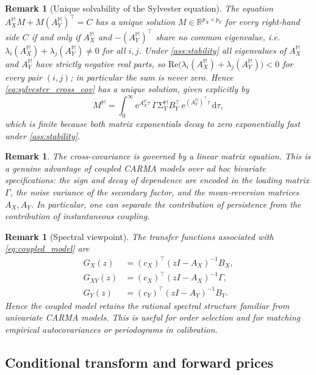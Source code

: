 \documentclass[10pt,a4paper,reqno]{amsart}
\newtheorem{remark}[theorem]{Remark}
\newcommand{\1}{\mathbbm{1}}
\newcommand{\dd}{\mathrm{d}}
\newcommand{\ee}{\mathrm{e}}
\begin{document}
\begin{remark}[Unique solvability of the Sylvester equation]
\label{rem:sylvester_unique}
The equation $A_X^{\mathbb{M}} M + M(A_Y^{\mathbb{M}})^\top = C$ has a unique
solution $M \in \mathbb{R}^{p_X \times p_Y}$ for every right-hand side $C$ if
and only if $A_X^{\mathbb{M}}$ and $-(A_Y^{\mathbb{M}})^\top$ share no common
eigenvalue, i.e.\ $\lambda_i(A_X^{\mathbb{M}}) + \lambda_j(A_Y^{\mathbb{M}}) \ne
0$ for all $i,j$.
Under \ref{ass:stability} all eigenvalues of
$A_X^{\mathbb{M}}$ and $A_Y^{\mathbb{M}}$ have strictly negative real parts, so
$\mathrm{Re}\bigl(\lambda_i(A_X^{\mathbb{M}}) + \lambda_j(A_Y^{\mathbb{M}})\bigr)
< 0$ for every pair $(i,j)$; in particular the sum is never zero.
Hence \eqref{eq:sylvester_cross_cov} has a unique solution, given explicitly by
$$
  M^{\mathbb{M}}
  = \int_0^\infty
      \ee^{A_X^{\mathbb{M}}\tau}\,
      \Gamma\Sigma_Y^{\mathbb{M}} B_Y^\top\,
      \ee^{(A_Y^{\mathbb{M}})^\top\tau}
    \,\dd\tau,
$$
which is finite because both matrix exponentials decay to zero exponentially fast
under \ref{ass:stability}.
\end{remark}

\begin{remark}
The cross-covariance is governed by a linear matrix equation. This is a genuine
advantage of coupled CARMA models over ad hoc bivariate specifications: the sign
and decay of dependence are encoded in the loading matrix $\Gamma$, the noise
variance of the secondary factor, and the mean-reversion matrices
$A_X, A_Y$. In particular, one can separate the contribution of persistence
from the contribution of instantaneous coupling.
\end{remark}

\begin{remark}[Spectral viewpoint]
The transfer functions associated with \eqref{eq:coupled_model} are
\begin{align*}
  G_X(z) &= (c_X)^\top (zI-A_X)^{-1} B_X,\\
  G_{XY}(z) &= (c_X)^\top (zI-A_X)^{-1} \Gamma,\\
  G_Y(z) &= (c_Y)^\top (zI-A_Y)^{-1} B_Y.
\end{align*}
Hence the coupled model retains the rational spectral structure familiar from
univariate CARMA models. This is useful for order selection and for matching
empirical autocovariances or periodograms in calibration.
\end{remark}

\subsection{Conditional transform and forward prices}
\end{document}
